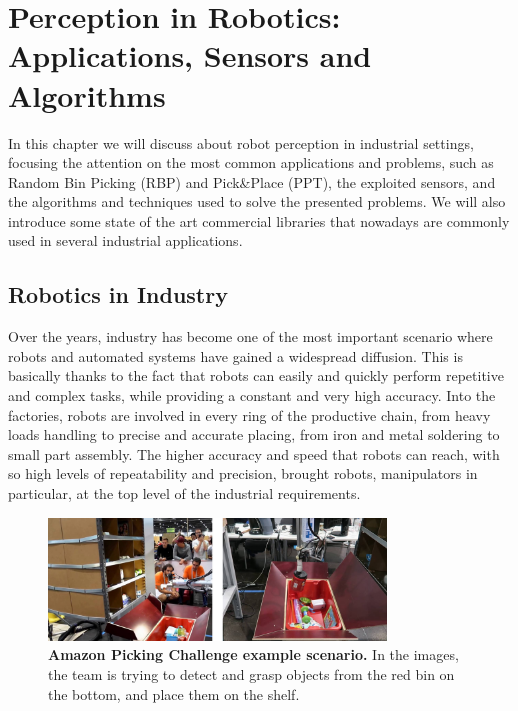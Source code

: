 \chapter{Perception in Robotics: Applications, Sensors and Algorithms}\label{ch:perceptionandsensing}
In this chapter we will discuss about robot perception in industrial settings, focusing the attention on the most common applications and problems, such as Random Bin Picking (RBP) and Pick\&Place (PPT), the exploited sensors, and the algorithms and techniques used to solve the presented problems. We will also introduce some state of the art commercial libraries that nowadays are commonly used in several industrial applications.
\section{Robotics in Industry}\label{sec:roboticsinindustry}
Over the years, industry has become one of the most important scenario where robots and automated systems have gained a widespread diffusion. This is basically thanks to the fact that robots can easily and quickly perform repetitive and complex tasks, while providing a constant and very high accuracy.
Into the factories, robots are involved in every ring of the productive chain, from heavy loads handling to precise and accurate placing, from iron and metal soldering to small part assembly. The higher accuracy and speed that robots can reach, with so high levels of repeatability and precision, brought robots, manipulators in particular, at the top level of the industrial requirements.

\begin{figure}
    \centering
    \includegraphics[width=0.8\textwidth]{figures/1_perception_and_sensing_in_robotics/amazon_picking_ch}
    \caption{\textbf{Amazon Picking Challenge example scenario.} In the images, the team is trying to detect and grasp objects from the red bin on the bottom, and place them on the shelf.} 
    \label{fig:amazon_picking_ch}
\end{figure}

